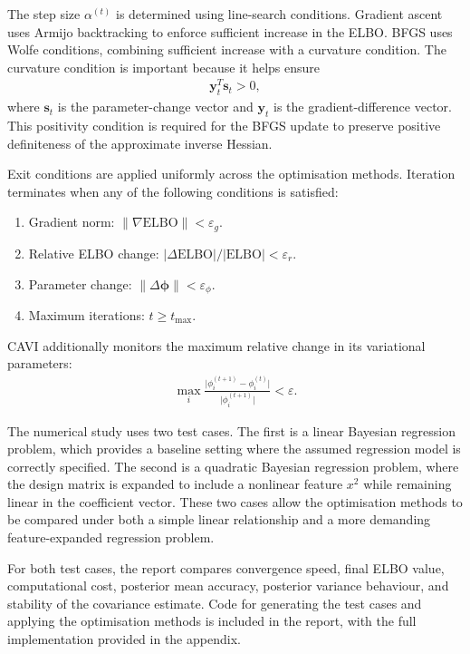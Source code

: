 \documentclass[11pt,a4paper]{article}
\newcommand{\ELBO}{\text{ELBO}}
\begin{document}
The step size $\alpha^{(t)}$ is determined using line-search conditions. Gradient ascent uses Armijo backtracking to enforce sufficient increase in the ELBO. BFGS uses Wolfe conditions, combining sufficient increase with a curvature condition. The curvature condition is important because it helps ensure
\begin{align}
\bm{y}_t^T \bm{s}_t > 0,
\end{align}
where $\bm{s}_t$ is the parameter-change vector and $\bm{y}_t$ is the gradient-difference vector. This positivity condition is required for the BFGS update to preserve positive definiteness of the approximate inverse Hessian.

Exit conditions are applied uniformly across the optimisation methods. Iteration terminates when any of the following conditions is satisfied:
\begin{enumerate}[label=(\roman*)]
  \item Gradient norm: $\lVert \nabla \ELBO \rVert < \varepsilon_g$.
  \item Relative ELBO change: $\lvert \Delta \ELBO \rvert / \lvert \ELBO \rvert < \varepsilon_r$.
  \item Parameter change: $\lVert \Delta \bm{\phi} \rVert < \varepsilon_\phi$.
  \item Maximum iterations: $t \geq t_{\max}$.
\end{enumerate}
CAVI additionally monitors the maximum relative change in its variational parameters:
\begin{align}
\max_i \frac{\lvert \phi_i^{(t+1)} - \phi_i^{(t)} \rvert}{\lvert \phi_i^{(t+1)} \rvert} < \varepsilon.
\end{align}

The numerical study uses two test cases. The first is a linear Bayesian regression problem, which provides a baseline setting where the assumed regression model is correctly specified. The second is a quadratic Bayesian regression problem, where the design matrix is expanded to include a nonlinear feature $x^2$ while remaining linear in the coefficient vector. These two cases allow the optimisation methods to be compared under both a simple linear relationship and a more demanding feature-expanded regression problem.

For both test cases, the report compares convergence speed, final ELBO value, computational cost, posterior mean accuracy, posterior variance behaviour, and stability of the covariance estimate. Code for generating the test cases and applying the optimisation methods is included in the report, with the full implementation provided in the appendix.
\end{document}
